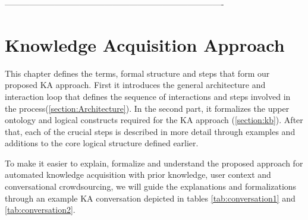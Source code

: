 -------------------------------------------------------------------------------
% 
\chapter{Knowledge Acquisition Approach}

This chapter defines the terms, formal structure and steps that form our 
proposed KA approach. First it introduces the general architecture and 
interaction loop that defines the sequence of interactions and steps
involved in the process(\autoref{section:Architecture}). In the second part, it
formalizes the upper ontology and logical constructs required for the KA 
approach (\autoref{section:kb}). After that, each of the crucial steps is 
described in more detail through examples and additions to the core logical 
structure defined earlier.

To make it easier to explain, formalize and understand the proposed approach 
for automated knowledge acquisition with prior knowledge, user context and 
conversational crowdsourcing, we will guide the explanations and formalizations
through an example KA conversation depicted in tables \ref{tab:conversation1}
and \ref{tab:conversation2}.

\newcommand{\step}[1]{\refstepcounter{stepno}\label{#1}}

